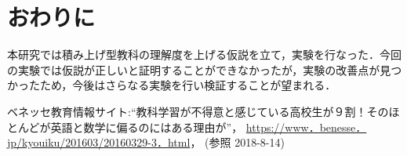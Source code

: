 \documentclass[twocolumn,10pt,a4j]{jsarticle}
\begin{document}
\vspace{1zh}
\begin{table}[H]
\centering
\caption{各クラスの偏差値と平均点}
\label{fig:12ank}
\end{table}




\section{おわりに}
本研究では積み上げ型教科の理解度を上げる仮説を立て，実験を行なった．今回の実験では仮説が正しいと証明することができなかったが，実験の改善点が見つかったため，今後はさらなる実験を行い検証することが望まれる．

\begin{thebibliography}{99}
ベネッセ教育情報サイト:“教科学習が不得意と感じている高校生が９割！そのほとんどが英語と数学に偏るのにはある理由が”， \url{https://www．benesse．jp/kyouiku/201603/20160329-3．html}， (参照 2018-8-14)
\end{thebibliography}
\end{document}
